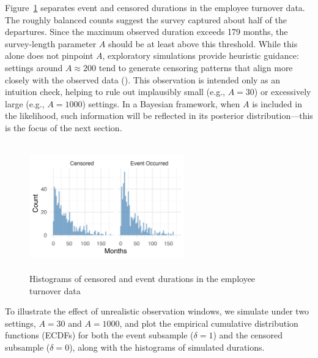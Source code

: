 Figure~\ref{fig:离职数据分开的直方图} separates event and censored durations in the employee turnover data. The roughly balanced counts suggest the survey captured about half of the departures. Since the maximum observed duration exceeds 179 months, the survey-length parameter $A$ should be at least above this threshold. While this alone does not pinpoint $A$, exploratory simulations provide heuristic guidance: settings around $A \approx 200$ tend to generate censoring patterns that align more closely with the observed data (). This observation is intended only as an intuition check, helping to rule out implausibly small (e.g., $A=30$) or excessively large (e.g., $A=1000$) settings. In a Bayesian framework, when $A$ is included in the likelihood, such information will be reflected in its posterior distribution—this is the focus of the next section.
\begin{figure}[H]
    \centering
    \includegraphics[height=5.5cm, width=0.6\textwidth]{images/separate_hist.png}
    \caption{{\small Histograms of censored and event durations in the employee turnover data}}
    \label{fig:离职数据分开的直方图}
\end{figure}
To illustrate the effect of unrealistic observation windows, we simulate under two settings, $A = 30$ and $A = 1000$, and plot the empirical cumulative distribution functions (ECDFs) for both the event subsample ($\delta = 1$) and the censored subsample ($\delta = 0$), along with the histograms of simulated durations.

